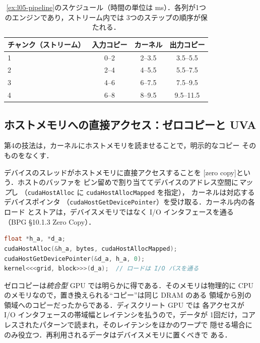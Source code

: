 \documentclass[../main.tex]{subfiles}
\begin{document}
\begin{table}[tb]
  \centering
  \small
  \caption{\cref{ex:l05-pipeline}のスケジュール（時間の単位は
    \si{\milli\second}）．各列が1つのエンジンであり，ストリーム内では
    3つのステップの順序が保たれる．}
  \label{tab:l05-pipeline}
  \begin{tabular}{lccc}
    \toprule
    チャンク（ストリーム） & 入力コピー & カーネル & 出力コピー \\
    \midrule
    1 & 0--2 & 2--3.5 & 3.5--5.5 \\
    2 & 2--4 & 4--5.5 & 5.5--7.5 \\
    3 & 4--6 & 6--7.5 & 7.5--9.5 \\
    4 & 6--8 & 8--9.5 & 9.5--11.5 \\
    \bottomrule
  \end{tabular}
\end{table}

\subsection{ホストメモリへの直接アクセス：ゼロコピーと UVA}

第4の技法は，カーネルにホストメモリを読ませることで，明示的なコピー
そのものをなくす．

\begin{definition}[ゼロコピー]
  デバイスのスレッドがホストメモリに直接アクセスすることを
  [zero copy]という．ホストのバッファを
  ピン留めで割り当ててデバイスのアドレス空間に\emph{マップ}し
  （\texttt{cudaHostAlloc} に \texttt{cudaHostAllocMapped} を指定），
  カーネルは対応するデバイスポインタ
  （\texttt{cudaHostGetDevicePointer}）を受け取る．カーネル内の各ロード
  とストアは，デバイスメモリではなく I/O インタフェースを通る
  （BPG §10.1.3 Zero Copy）．
\end{definition}

\begin{lstlisting}[language=C++, numbers=none]
float *h_a, *d_a;
cudaHostAlloc(&h_a, bytes, cudaHostAllocMapped);
cudaHostGetDevicePointer(&d_a, h_a, 0);
kernel<<<grid, block>>>(d_a);  // ロードは I/O バスを通る
\end{lstlisting}

ゼロコピーは\emph{統合型} GPU では明らかに得である．そのメモリは物理的に
CPU のメモリなので，置き換えられる\enquote{コピー}は同じ DRAM のある
領域から別の領域へのコピーだったからである．ディスクリート GPU では
各アクセスが I/O インタフェースの帯域幅とレイテンシを払うので，データが
1回だけ，コアレスされたパターンで読まれ，そのレイテンシをほかのワープで
隠せる場合にのみ役立つ．再利用されるデータはデバイスメモリに置くべきで
ある．
\end{document}

